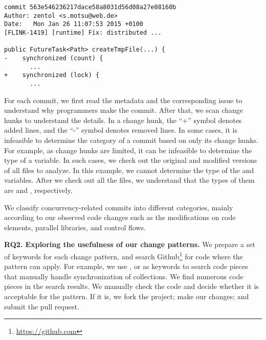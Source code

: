 \begin{lstlisting}
commit 563e546236217dace58a8031d56d08a27e08160b
Author: zentol <s.motsu@web.de>
Date:   Mon Jan 26 11:07:53 2015 +0100
[FLINK-1419] [runtime] Fix: distributed ...

public FutureTask<Path> createTmpFile(...) {
-    synchronized (count) {
       ...
+    synchronized (lock) {
       ...
\end{lstlisting}

For each commit, we first read the metadata and the corresponding issue to understand why programmers make the commit. After that, we scan change hunks to understand the details. In a change hunk, the ``+'' symbol denotes added lines, and the ``-'' symbol denotes removed lines. In some cases, it is infeasible to determine the category of a commit based on only its change hunks. For example, as change hunks are limited, it can be infeasible to determine the type of a variable. In such cases, we check out the original and modified versions of all files to analyze. In this example, we cannot determine the type of the  and  variables. After we check out all the files, we understand that the types of them are  and , respectively.

We classify concurrency-related commits into different categories, mainly according to our observed code changes such as the modifications on code elements, parallel libraries, and control flows.

\textbf{RQ2. Exploring the usefulness of our change patterns.} We prepare a set of keywords for each change pattern, and search Github\footnote{\url{https://github.com}} for code where the pattern can apply. For example, we use ,  or  as keywords to search code pieces that manually handle synchronization of collections. We find numerous code pieces in the search results. We manually check the code and decide whether it is acceptable for the pattern. If it is, we fork the project; make our changes; and submit the pull request.







